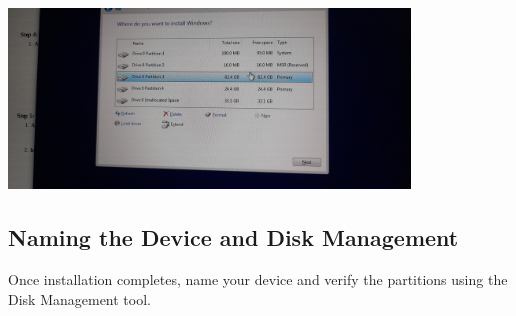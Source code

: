 \documentclass[a4paper]{article}
\begin{document}
\begin{center}
    \includegraphics[width=0.8\textwidth]{17.jpeg} %
\end{center}

\subsection{Naming the Device and Disk Management}
Once installation completes, name your device and verify the partitions using the Disk Management tool.
\end{document}
